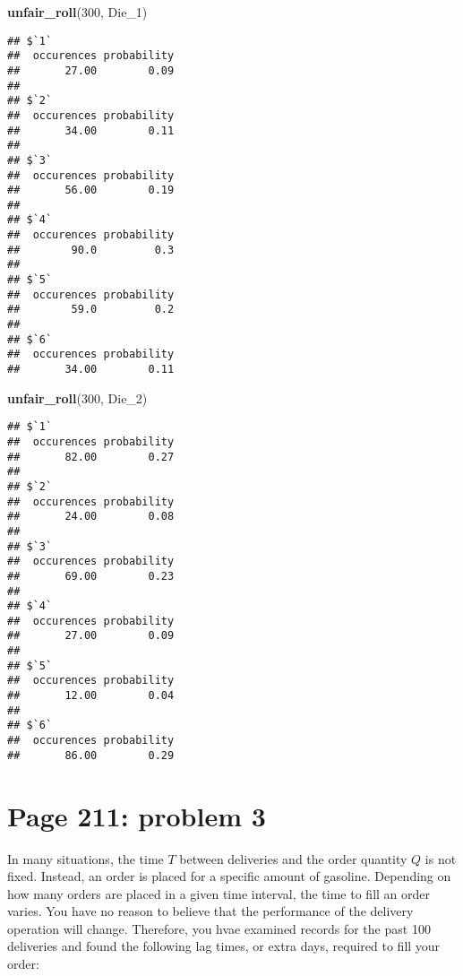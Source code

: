 \documentclass[]{article}
\newenvironment{Shaded}{\begin{snugshade}}{\end{snugshade}}
\newcommand{\KeywordTok}[1]{\textcolor[rgb]{0.13,0.29,0.53}{\textbf{{#1}}}}
\newcommand{\DecValTok}[1]{\textcolor[rgb]{0.00,0.00,0.81}{{#1}}}
\newcommand{\NormalTok}[1]{{#1}}
\begin{document}
\begin{Shaded}
\begin{Highlighting}[]
\KeywordTok{unfair_roll}\NormalTok{(}\DecValTok{300}\NormalTok{, Die_1)}
\end{Highlighting}
\end{Shaded}

\begin{verbatim}
## $`1`
##  occurences probability 
##       27.00        0.09 
## 
## $`2`
##  occurences probability 
##       34.00        0.11 
## 
## $`3`
##  occurences probability 
##       56.00        0.19 
## 
## $`4`
##  occurences probability 
##        90.0         0.3 
## 
## $`5`
##  occurences probability 
##        59.0         0.2 
## 
## $`6`
##  occurences probability 
##       34.00        0.11
\end{verbatim}

\begin{Shaded}
\begin{Highlighting}[]
\KeywordTok{unfair_roll}\NormalTok{(}\DecValTok{300}\NormalTok{, Die_2)}
\end{Highlighting}
\end{Shaded}

\begin{verbatim}
## $`1`
##  occurences probability 
##       82.00        0.27 
## 
## $`2`
##  occurences probability 
##       24.00        0.08 
## 
## $`3`
##  occurences probability 
##       69.00        0.23 
## 
## $`4`
##  occurences probability 
##       27.00        0.09 
## 
## $`5`
##  occurences probability 
##       12.00        0.04 
## 
## $`6`
##  occurences probability 
##       86.00        0.29
\end{verbatim}

\section{Page 211: problem 3}\label{page-211-problem-3}

In many situations, the time \(T\) between deliveries and the order
quantity \(Q\) is not fixed. Instead, an order is placed for a specific
amount of gasoline. Depending on how many orders are placed in a given
time interval, the time to fill an order varies. You have no reason to
believe that the performance of the delivery operation will change.
Therefore, you hvae examined records for the past 100 deliveries and
found the following lag times, or extra days, required to fill your
order:
\end{document}
